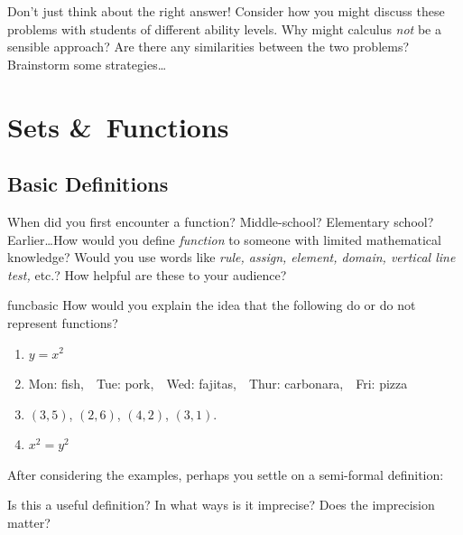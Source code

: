 
Don't just think about the right answer! Consider how you might discuss these problems with students of different ability levels. Why might calculus \emph{not} be a sensible approach? Are there any similarities between the two problems? Brainstorm some strategies\ldots



\pagebreak[3]



\section{Sets \&\ Functions}\label{chap:func}

\subsection{Basic Definitions}\label{sec:funcdef}

When did you first encounter a function? Middle-school? Elementary school? Earlier\ldots How would you define \emph{function} to someone with limited mathematical knowledge? Would you use words like \emph{rule, assign, element, domain, vertical line test,} etc.? How helpful are these to your audience?

\begin{examples}{}{funcbasic}
	How would you explain the idea that the following do or do not represent functions?
	\begin{enumerate}
	  \item $y=x^2$
	  \item\label{ex:funcbasic2} Mon: fish,\ \ Tue: pork,\ \ Wed: fajitas,\ \ Thur: carbonara,\ \ Fri: pizza
	  \item $(3,5)$, $(2,6)$, $(4,2)$, $(3,1)$.
	  \item $x^2=y^2$
	\end{enumerate}
\end{examples}

After considering the examples, perhaps you settle on a semi-formal definition:
\begin{quote}
\end{quote}
Is this a useful definition? In what ways is it imprecise? Does the imprecision matter?
\bigbreak

